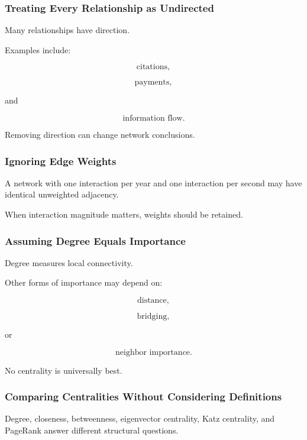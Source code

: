 \subsubsection{Treating Every Relationship as Undirected}

Many relationships have direction.

Examples include:

\[
\boxed{
\text{citations},
}
\]

\[
\boxed{
\text{payments},
}
\]

and

\[
\boxed{
\text{information flow}.
}
\]

Removing direction can change network conclusions.

\subsubsection{Ignoring Edge Weights}

A network with one interaction per year and one interaction per second may
have identical unweighted adjacency.

When interaction magnitude matters, weights should be retained.

\subsubsection{Assuming Degree Equals Importance}

Degree measures local connectivity.

Other forms of importance may depend on:

\[
\boxed{
\text{distance},
}
\]

\[
\boxed{
\text{bridging},
}
\]

or

\[
\boxed{
\text{neighbor importance}.
}
\]

No centrality is universally best.

\subsubsection{Comparing Centralities Without Considering Definitions}

Degree, closeness, betweenness, eigenvector centrality, Katz centrality, and
PageRank answer different structural questions.

